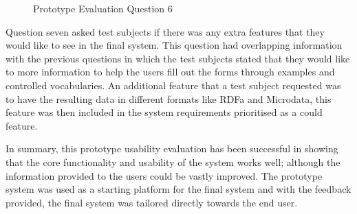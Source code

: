 {\begin{figure}[!h]
  \centering
  \begin{minipage}[b]{0.47\textwidth}
    \caption{Prototype Evaluation Question 6}
    \label{fig:prototypeQuestion6}
  \end{minipage}
\end{figure}
}

Question seven asked test subjects if there was any extra features that they would like to see in the final system. This question had overlapping information with the previous questions in which the test subjects stated that they would like to more information to help the users fill out the forms through examples and controlled vocabularies. An additional feature that a test subject requested was to have the resulting data in different formats like RDFa and Microdata, this feature was then included in the system requirements prioritised as a could feature.

In summary, this prototype usability evaluation has been successful in showing that the core functionality and usability of the system works well; although the information provided to the users could be vastly improved. The prototype system was used as a starting platform for the final system and with the feedback provided, the final system was tailored directly towards the end user.  

\newpage
